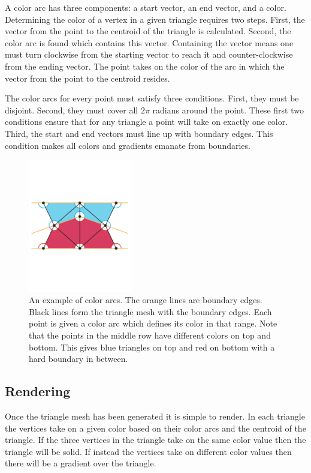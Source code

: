 \documentclass[conference]{acmsiggraph}
\begin{document}
A color arc has three components: a start vector, an end vector, and a color. 
Determining the color of a vertex in a given triangle requires two steps. First,
the vector from the point to the centroid of the triangle is calculated. Second,
the color arc is found which contains this vector. Containing the vector means one must turn
clockwise from the starting vector to reach it and counter-clockwise from the ending vector.
The point takes on the color of the arc in which the vector from the point to the centroid resides.

The color arcs for every point must satisfy three conditions. First, they must be disjoint. Second,
they must cover all $2\pi$ radians around the point. These first two conditions ensure that for any
triangle a point will take on exactly one color. Third, the start and end vectors must line up
with boundary edges. This condition makes all colors and gradients emanate from boundaries.

\begin{figure}
    \centering
        \includegraphics[width=0.4\textwidth]{images/colorarcs}
    \caption{An example of color arcs. The orange lines are boundary edges. Black lines form the triangle
    mesh with the boundary edges. Each point is given a color arc which defines its color in that range.
    Note that the points in the middle row have different colors on top and bottom. This gives blue
    triangles on top and red on bottom with a hard boundary in between.}
\end{figure}

\subsection{Rendering}
Once the triangle mesh has been generated it is simple to render. In each triangle the vertices
take on a given color based on their color arcs and the centroid of the triangle. If the three
vertices in the triangle take on the same color value then the triangle will be solid. If instead the 
vertices take on different color values then there will be a gradient over the triangle.
\end{document}
